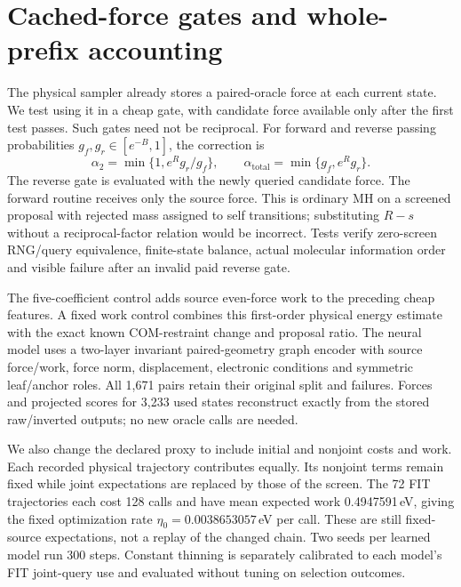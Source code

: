 \section{Cached-force gates and whole-prefix accounting}
\label{app:source-force-screen}

The physical sampler already stores a paired-oracle force at each current state.
We test using it in a cheap gate, with candidate force available only after the
first test passes. Such gates need not be reciprocal. For forward and reverse
passing probabilities $g_f,g_r\in[e^{-B},1]$, the correction is
\begin{equation}
 \alpha_2=\min\{1,e^R g_r/g_f\},\qquad
 \alpha_{\mathrm{total}}=\min\{g_f,e^R g_r\}.
\end{equation}
The reverse gate is evaluated with the newly queried candidate force. The
forward routine receives only the source force. This is ordinary MH on a
screened proposal with rejected mass assigned to self transitions; substituting
$R-s$ without a reciprocal-factor relation would be incorrect. Tests verify
zero-screen RNG/query equivalence, finite-state balance, actual molecular
information order and visible failure after an invalid paid reverse gate.

The five-coefficient control adds source even-force work to the preceding cheap
features. A fixed work control combines this first-order physical energy estimate
with the exact known COM-restraint change and proposal ratio. The neural model
uses a two-layer invariant paired-geometry graph encoder with source force/work,
force norm, displacement, electronic conditions and symmetric leaf/anchor roles.
All 1,671 pairs retain their original split and failures. Forces and projected
scores for 3,233 used states reconstruct exactly from the stored raw/inverted
outputs; no new oracle calls are needed.

We also change the declared proxy to include initial and nonjoint costs and work.
Each recorded physical trajectory contributes equally. Its nonjoint terms remain
fixed while joint expectations are replaced by those of the screen. The 72 FIT
trajectories each cost 128 calls and have mean expected work 0.4947591\,eV, giving
the fixed optimization rate $\eta_0=0.0038653057$\,eV per call. These are still
fixed-source expectations, not a replay of the changed chain. Two seeds per
learned model run 300 steps. Constant thinning is separately calibrated to each
model's FIT joint-query use and evaluated without tuning on selection outcomes.

